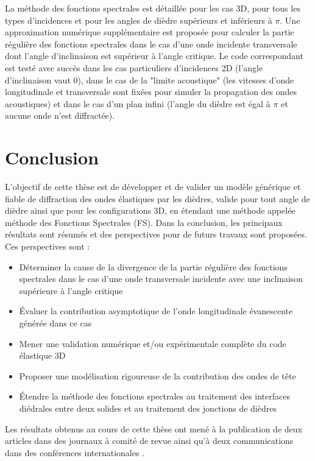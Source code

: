 La méthode des fonctions spectrales est détaillée pour les cas 3D, pour tous les types d'incidences et pour les angles de dièdre supérieurs et inférieurs à $\pi$. Une approximation numérique supplémentaire est proposée pour calculer la partie régulière des fonctions spectrales dans le cas d'une onde incidente transversale dont l'angle d'inclinaison est supérieur à l'angle critique. Le code correspondant est testé avec succès dans les cas particuliers d'incidences 2D (l'angle d'inclinaison vaut $0$), dans le cas de la "limite acoustique" (les vitesses d'onde longitudinale et transversale sont fixées pour simuler la propagation des ondes acoustiques) et dans le cas d'un plan infini (l'angle du dièdre est égal à $\pi$ et aucune onde n'est diffractée).

\section[Conclusion]{Conclusion}

L'objectif de cette thèse est de développer et de valider un modèle générique et fiable de diffraction des ondes élastiques par les dièdres, valide pour tout angle de dièdre ainsi que pour les configurations 3D, en étendant une méthode appelée méthode des Fonctions Spectrales (FS). Dans la conclusion, les principaux résultats sont résumés et des perspectives pour de futurs travaux sont proposées. Ces perspectives sont :
\begin{itemize}
\item Déterminer la cause de la divergence de la partie régulière des fonctions spectrales dans le cas d'une onde transversale incidente avec une inclinaison supérieure à l'angle critique
\item Évaluer la contribution asymptotique de l'onde longitudinale évanescente générée dans ce cas
\item Mener une validation numérique et/ou expérimentale complète du code élastique 3D
\item Proposer une modélisation rigoureuse de la contribution des ondes de tête
\item Étendre la méthode des fonctions spectrales au traitement des interfaces diédrales entre deux solides et au traitement des jonctions de dièdres
\end{itemize}


Les résultats obtenus au cours de cette thèse ont mené à la publication de deux articles dans des journaux à comité de revue \cite{article, articleelasto} ainsi qu'à deux communications dans des conférences internationales \cite{DD2018,AFPAC}.